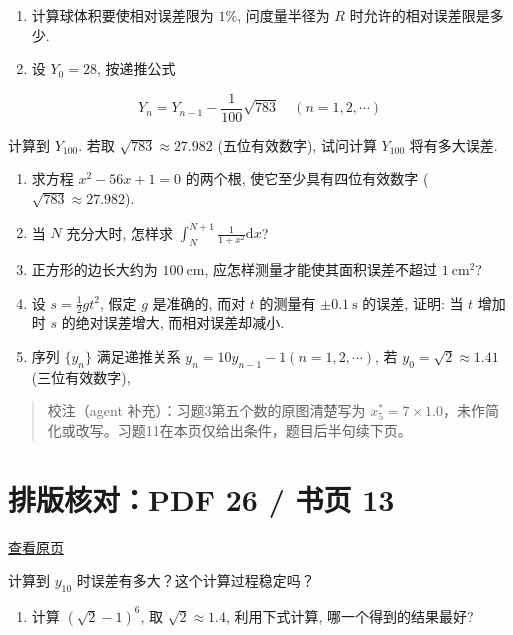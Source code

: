 \documentclass[
  10pt,
  a4paper,
]{article}
\providecommand{\tightlist}{%
  \setlength{\itemsep}{0pt}\setlength{\parskip}{0pt}}
\begin{document}
\begin{enumerate}
\def\labelenumi{\arabic{enumi}.}
\setcounter{enumi}{4}
\item
  计算球体积要使相对误差限为 \(1\%\), 问度量半径为 \(R\)
  时允许的相对误差限是多少.
\item
  设 \(Y_0=28\), 按递推公式
\end{enumerate}

\[
Y_n = Y_{n-1} - \frac{1}{100} \sqrt{783} \quad (n=1,2,\cdots)
\]

计算到 \(Y_{100}\). 若取 \(\sqrt{783} \approx 27.982\) (五位有效数字),
试问计算 \(Y_{100}\) 将有多大误差.

\begin{enumerate}
\def\labelenumi{\arabic{enumi}.}
\setcounter{enumi}{6}
\item
  求方程 \(x^2-56x+1=0\) 的两个根, 使它至少具有四位有效数字
  (\(\sqrt{783} \approx 27.982\)).
\item
  当 \(N\) 充分大时, 怎样求
  \(\int_N^{N+1} \frac{1}{1+x^2} \mathrm{d}x\)?
\item
  正方形的边长大约为 \(100 \mathrm{~cm}\),
  应怎样测量才能使其面积误差不超过 \(1 \mathrm{~cm}^2\)?
\item
  设 \(s=\frac{1}{2} g t^2\), 假定 \(g\) 是准确的, 而对 \(t\) 的测量有
  \(\pm 0.1 \mathrm{~s}\) 的误差, 证明: 当 \(t\) 增加时 \(s\)
  的绝对误差增大, 而相对误差却减小.
\item
  序列 \(\{y_n\}\) 满足递推关系 \(y_n=10y_{n-1}-1 (n=1,2,\cdots)\), 若
  \(y_0=\sqrt{2} \approx 1.41\) (三位有效数字),
\end{enumerate}

\begin{quote}
校注（agent 补充）：习题3第五个数的原图清楚写为
\(x_5^*=7\times1.0\)，未作简化或改写。习题11在本页仅给出条件，题目后半句续下页。
\end{quote}

\newpage

\section{排版核对：PDF 26 / 书页
13}\label{ux6392ux7248ux6838ux5bf9pdf-26-ux4e66ux9875-13}

\href{../../../source-images/pdf-026.jpeg}{查看原页}

计算到 \(y_{10}\) 时误差有多大？这个计算过程稳定吗？

\begin{enumerate}
\def\labelenumi{\arabic{enumi}.}
\setcounter{enumi}{11}
\tightlist
\item
  计算 \((\sqrt{2}-1)^6\), 取 \(\sqrt{2} \approx 1.4\), 利用下式计算,
  哪一个得到的结果最好?
\end{enumerate}
\end{document}
